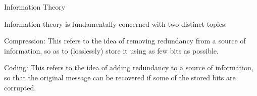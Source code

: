 Information Theory
 
Information theory is fundamentally concerned with two distinct topics:
 
Compression: This refers to the idea of removing redundancy from a source of information, so
as to (losslessly) store it using as few bits as possible.
 
Coding: This refers to the idea of adding redundancy to a source of information, so that the
original message can be recovered if some of the stored bits are corrupted.
